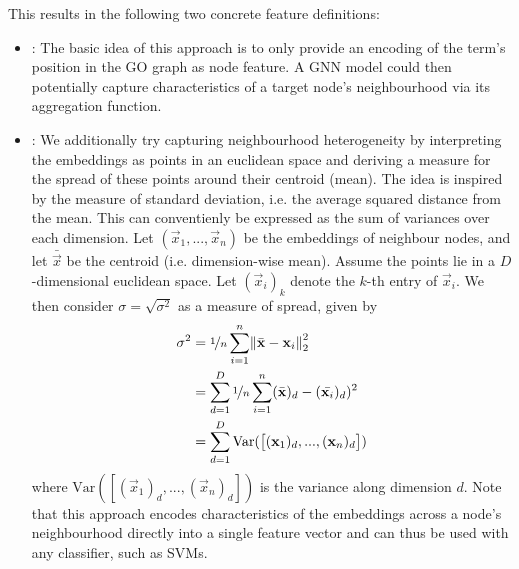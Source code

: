\documentclass[
	fontsize=10pt, %
	twoside=false, %
	secnumdepth=1, %
]{kaobook}
\begin{document}
This results in the following two concrete feature definitions:
\begin{itemize}
\item {}: The basic idea of this approach is to only provide an
  encoding of the term's position in the GO graph as node feature. A GNN model
  could then potentially capture characteristics of a target node's
  neighbourhood via its aggregation function.
\item {}: We additionally try capturing neighbourhood
  heterogeneity by interpreting the embeddings as points in an euclidean space
  and deriving a measure for the spread of these points around their centroid
  (mean). The idea is inspired by the measure of standard deviation, i.e. the
  average squared distance from the mean. This can conventienly be expressed as
  the sum of variances over each dimension. Let $(\vec x_1, ..., \vec x_n)$ be
  the embeddings of neighbour nodes, and let $\bar{\vec x}$ be the centroid
  (i.e. dimension-wise mean). Assume the points lie in a $D$-dimensional
  euclidean space. Let $(\vec x_i)_k$ denote the $k$-th entry of $\vec x_i$. We
  then consider $\sigma = \sqrt{\sigma^2}$ as a measure of spread, given by
  \begin{align*}
    \sigma^2 &= \nicefrac{1}{n} \sum_{i=1}^n \norm{\bar{\mathbf{x}} - \mathbf{x}_i}_2^2 \\
             &= \sum_{d=1}^D \nicefrac{1}{n} \sum_{i=1}^n
               (\bar{\mathbf{x}})_d - (\bar{\mathbf{x}_i})_d)^2 \\
             &= \sum_{d=1}^D \text{Var}(\left[
               (\mathbf{x}_1)_d, ..., (\mathbf{x}_n)_d
               \right])
  \end{align*}
  where $\text{Var}(\left[(\vec x_1)_d, ..., (\vec x_n)_d \right])$ is the
  variance along dimension $d$.
  Note that this approach encodes characteristics of the embeddings across a
  node's neighbourhood directly into a single feature vector and can thus be
  used with any classifier, such as SVMs.
\end{itemize}

\end{document}
